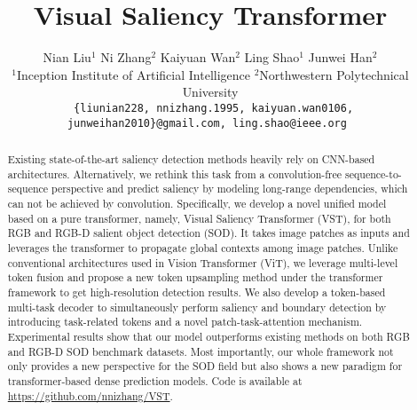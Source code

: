 \documentclass[10pt,twocolumn,letterpaper]{article}
\begin{document}
\title{Visual Saliency Transformer}

\author{
	Nian Liu$^{1}$\footnotemark[1]
	\hspace{25pt}
	Ni Zhang$^{2}$\footnotemark[1]
	\hspace{25pt}
	Kaiyuan Wan$^{2}$
	\hspace{25pt}
	Ling Shao$^{1}$
	\hspace{25pt}
	Junwei Han$^{2}$\footnotemark[2]
	\hspace{25pt}
	\\
	$^1$Inception Institute of Artificial Intelligence
	\hspace{8pt}
	$^2$Northwestern Polytechnical University
	\\
	{\tt\small
    \{liunian228, nnizhang.1995, kaiyuan.wan0106, junweihan2010\}@gmail.com, ling.shao@ieee.org
    }
}

\maketitle
{}

\ificcvfinal\thispagestyle{empty}\fi


\begin{abstract}
    Existing state-of-the-art saliency detection methods heavily rely on CNN-based architectures. 
    Alternatively, we rethink this task from a convolution-free sequence-to-sequence perspective and predict saliency by modeling long-range dependencies, which can not be achieved by convolution.
    Specifically, we develop a novel unified model based on a pure transformer, namely, Visual Saliency Transformer (VST), for both RGB and RGB-D salient object detection (SOD). It takes image patches as inputs and leverages the transformer to propagate global contexts among image patches.
    Unlike conventional architectures used in Vision Transformer (ViT), we leverage multi-level token fusion and propose a new token upsampling method under the transformer framework to get high-resolution detection results. 
    We also develop a token-based multi-task decoder to simultaneously perform saliency and boundary detection by introducing task-related tokens and a novel patch-task-attention mechanism.
    Experimental results show that our model outperforms existing methods on both RGB and RGB-D SOD benchmark datasets. Most importantly, our whole framework not only provides a new perspective for the SOD field but also shows a new paradigm for transformer-based dense prediction models. Code is available at \url{https://github.com/nnizhang/VST}.
\end{abstract}
\end{document}

